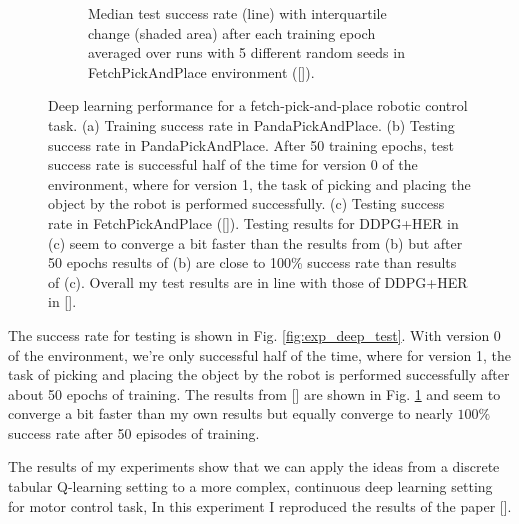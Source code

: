 \documentclass[conference]{IEEEtran}
\begin{document}
\begin{figure}[ht]
\begin{subfigure}[t]{0.30\textwidth}
\caption{Median test success rate (line) with interquartile change (shaded area) after each training epoch averaged over runs with 5 different random seeds in FetchPickAndPlace environment ([\cite{plappert2018multi}]).}
\label{fig:exp_deep_test_plappert}
\end{subfigure}
\caption{Deep learning performance for a fetch-pick-and-place robotic control task. (a) Training success rate in PandaPickAndPlace. (b) Testing success rate in PandaPickAndPlace. After 50 training epochs, test success rate is successful half of the time for version 0 of the environment, where for version 1, the task of picking and placing the object by the robot is performed successfully. (c) Testing success rate in FetchPickAndPlace ([\cite{plappert2018multi}]). Testing results for DDPG+HER in (c) seem to converge a bit faster than the results from (b) but after 50 epochs results of (b) are close to 100\% success rate than results of (c). Overall my test results are in line with those of DDPG+HER in [\cite{plappert2018multi}].}
\label{fig:exp_deep_perf}
\end{figure}

The success rate for testing is shown in Fig. \ref{fig:exp_deep_test}. With version 0 of the environment, we're only successful half of the time, where for version 1, the task of picking and placing the object by the robot is performed successfully after about 50 epochs of training. The results from [\cite{plappert2018multi}] are shown in Fig. \ref{fig:exp_deep_test_plappert} and seem to converge a bit faster than my own results but equally converge to nearly $100\%$ success rate after 50 episodes of training.

The results of my experiments show that we can apply the ideas from a discrete tabular Q-learning setting to a more complex, continuous deep learning setting for motor control task, In this experiment I reproduced the results of the paper [\cite{plappert2018multi}]. 
\end{document}
